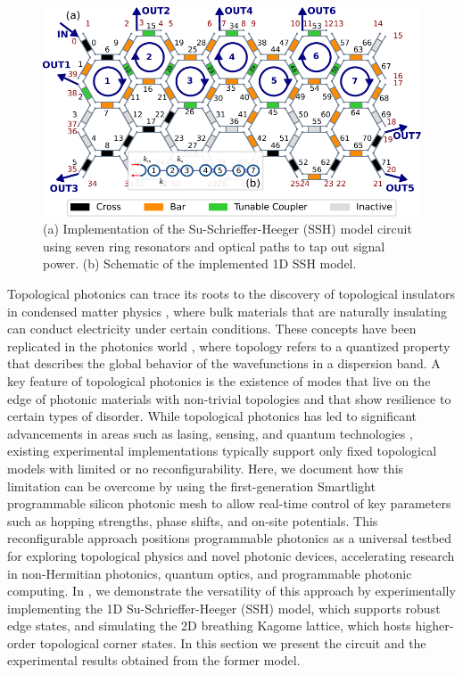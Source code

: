 \begin{figure}[b!]
	\begin{center}
		\includegraphics{figures/ch3-topological-ssh.pdf}
	\end{center}
	\caption{(a) Implementation of the Su-Schrieffer-Heeger (SSH) model circuit using seven ring resonators and optical paths to tap out signal power. (b) Schematic of the implemented 1D SSH model.}\label{fig:ch3-topological_ssh}
\end{figure}

Topological photonics can trace its roots to the discovery of topological insulators in condensed matter physics \cite{klitzing_new_1980,thouless_quantized_1982}, where bulk materials that are naturally insulating can conduct electricity under certain conditions.
These concepts have been replicated in the photonics world \cite{ozawa_topological_2019,price_roadmap_2022}, where topology refers to a quantized property that describes the global behavior of the wavefunctions in a dispersion band.
A key feature of topological photonics is the existence of modes that live on the edge of photonic materials with non-trivial topologies and that show resilience to certain types of disorder.
While topological photonics has led to significant advancements in areas such as lasing, sensing, and quantum technologies \cite{shalaev_robust_2019,bahari_nonreciprocal_2017,ezawa_higher-order_2018,blanco-redondo_topological_2018}, existing experimental implementations typically support only fixed topological models with limited or no reconfigurability.
Here, we document how this limitation can be overcome by using the first-generation Smartlight programmable silicon photonic mesh to allow real-time control of key parameters such as hopping strengths, phase shifts, and on-site potentials.
This reconfigurable approach positions programmable photonics as a universal testbed for exploring topological physics and novel photonic devices, accelerating research in non-Hermitian photonics, quantum optics, and programmable photonic computing.
In \cite{on_programmable_2024}, we demonstrate the versatility of this approach by experimentally implementing the 1D Su-Schrieffer-Heeger (SSH) model, which supports robust edge states, and simulating the 2D breathing Kagome lattice, which hosts higher-order topological corner states.
In this section we present the circuit and the experimental results obtained from the former model.

